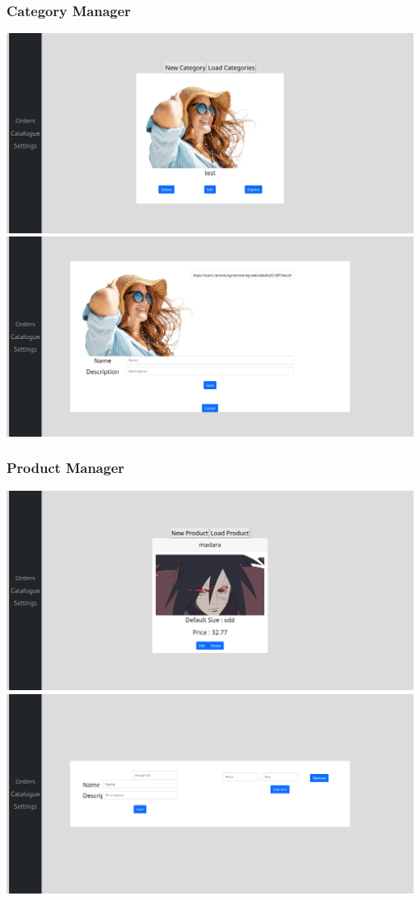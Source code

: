 \documentclass{article}
\begin{document}
\subsubsection{Category Manager}
\includegraphics[scale=0.25]{./out/ReactApp/Ui/Category/Category.png}\\
\includegraphics[scale=0.25]{./out/ReactApp/Ui/Category/CategoryEdit.png}


\subsubsection{Product Manager}
\includegraphics[scale=0.25]{./out/ReactApp/Ui/Product/Product.png}\\
\includegraphics[scale=0.25]{./out/ReactApp/Ui/Product/ProductEdit.png}
\end{document}
